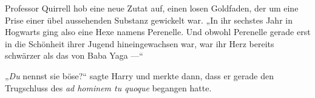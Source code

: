 Professor Quirrell hob eine neue Zutat auf, einen losen Goldfaden, der um eine Prise einer übel aussehenden Substanz gewickelt war.
„In ihr sechstes Jahr in Hogwarts ging also eine Hexe namens Perenelle. Und obwohl Perenelle gerade erst in die Schönheit ihrer Jugend hineingewachsen war, war ihr Herz bereits schwärzer als das von Baba Yaga —“

„\emph{Du} nennst sie böse?“ sagte Harry und merkte dann, dass er gerade den Trugschluss des \emph{ad hominem tu quoque} begangen hatte.

